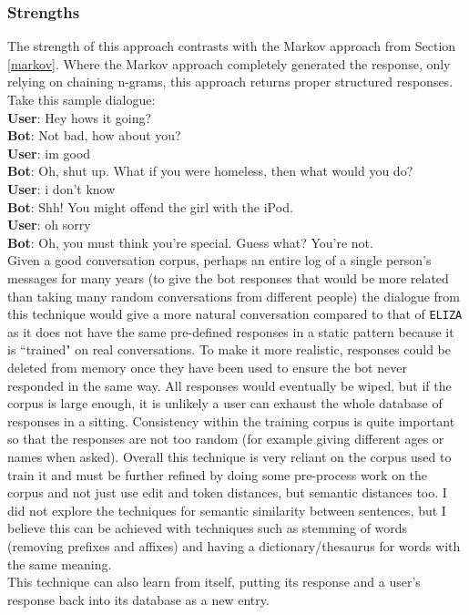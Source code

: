 \documentclass{article}
\newcommand{\n}[0]{\\[\baselineskip]}
\begin{document}
\subsubsection{Strengths}
The strength of this approach contrasts with the Markov approach from Section \ref{markov}. Where the Markov approach completely generated the response, only relying on chaining n-grams, this approach returns proper structured responses. Take this sample dialogue:
\n
\textbf{User}: Hey hows it going?
\\ \textbf{Bot}: Not bad, how about you?
\\ \textbf{User}: im good
\\ \textbf{Bot}: Oh, shut up. What if you were homeless, then what would you do?
\\ \textbf{User}: i don't know
\\ \textbf{Bot}: Shh! You might offend the girl with the iPod.
\\ \textbf{User}: oh sorry
\\ \textbf{Bot}: Oh, you must think you're special. Guess what? You're not.
\n
Given a good conversation corpus, perhaps an entire log of a single person's messages for many years (to give the bot responses that would be more related than taking many random conversations from different people) the dialogue from this technique would give a more natural conversation compared to that of \texttt{ELIZA} as it does not have the same pre-defined responses in a static pattern because it is ``trained" on real conversations. To make it more realistic, responses could be deleted from memory once they have been used to ensure the bot never responded in the same way. All responses would eventually be wiped, but if the corpus is large enough, it is unlikely a user can exhaust the whole database of responses in a sitting. Consistency within the training corpus is quite important so that the responses are not too random (for example giving different ages or names when asked). Overall this technique is very reliant on the corpus used to train it and must be further refined by doing some pre-process work on the corpus and not just use edit and token distances, but semantic distances too. I did not explore the techniques for semantic similarity between sentences, but I believe this can be achieved with techniques such as stemming of words (removing prefixes and affixes) and having a dictionary/thesaurus for words with the same meaning.
\n
This technique can also learn from itself, putting its response and a user's response back into its database as a new entry.
\end{document}
